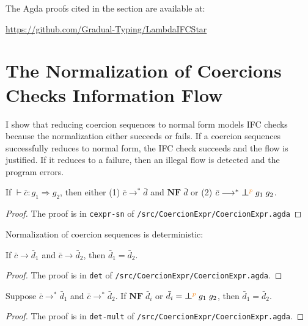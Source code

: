 The Agda proofs cited in the section are available at:
\begin{center}
  \url{https://github.com/Gradual-Typing/LambdaIFCStar}
\end{center}

\section{The Normalization of Coercions Checks Information Flow}
\label{sec:norm-IF}

I show that reducing coercion sequences to normal form models IFC checks because
the normalization either succeeds or fails. If a coercion sequences successfully
reduces to normal form, the IFC check succeeds and the flow is justified. If it
reduces to a failure, then an illegal flow is detected and the program errors.

\begin{lemma}
If $\vdash \bar{c} : g_1 \Rightarrow g_2$, then either
(1) $\bar{c} \longrightarrow^{*} \bar{d}$ and $\mathbf{NF}\;\bar{d}$ or
(2) $\bar{c} \longrightarrow^{*} \err{g_1}{g_2}{p}$.
\end{lemma}
\begin{proof}
  The proof is in \texttt{cexpr-sn} of
  \texttt{/src/CoercionExpr/CoercionExpr.agda}
\end{proof}

\noindent Normalization of coercion sequences is deterministic:

\begin{lemma}
If $\bar{c} \longrightarrow \bar{d}_1$ and $\bar{c} \longrightarrow \bar{d}_2$,
then $\bar{d}_1 = \bar{d}_2$.
\end{lemma}
\begin{proof}
  The proof is in \texttt{det} of \texttt{/src/CoercionExpr/CoercionExpr.agda}.
\end{proof}

\begin{lemma}
Suppose $\bar{c} \longrightarrow^{*} \bar{d}_1$
and $\bar{c} \longrightarrow^{*} \bar{d}_2$.
If $\mathbf{NF}\;\bar{d}_i$ or $\bar{d}_i = \err{g_1}{g_2}{p}$,
then $\bar{d}_1 = \bar{d}_2$.
\end{lemma}
\begin{proof}
  The proof is in \texttt{det-mult} of \texttt{/src/CoercionExpr/CoercionExpr.agda}.
\end{proof}

